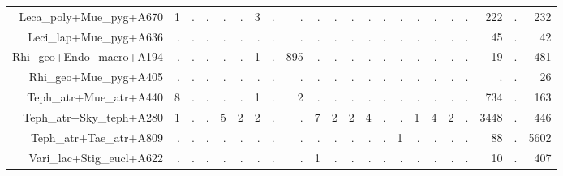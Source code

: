 \documentclass[a4paper, 11]{article}\usepackage[]{graphicx}\usepackage[]{color}
\begin{document}
\begin{table}
\begin{tabular}{rrrrrrrrrrrrrrrrrrrrrr}
  Leca\_poly+Mue\_pyg+A670 & 1 & . & . & . & . & 3 & . & . & . & . & . & . & . & . & . & . & . & . & 222 & . & 232 \\ 
  Leci\_lap+Mue\_pyg+A636 & . & . & . & . & . & . & . & . & . & . & . & . & . & . & . & . & . & . & 45 & . & 42 \\ 
  Rhi\_geo+Endo\_macro+A194 & . & . & . & . & . & 1 & . & 895 & . & . & . & . & . & . & . & . & . & . & 19 & . & 481 \\ 
  Rhi\_geo+Mue\_pyg+A405 & . & . & . & . & . & . & . & . & . & . & . & . & . & . & . & . & . & . & . & . & 26 \\ 
  Teph\_atr+Mue\_atr+A440 & 8 & . & . & . & . & 1 & . & 2 & . & . & . & . & . & . & . & . & . & . & 734 & . & 163 \\ 
  Teph\_atr+Sky\_teph+A280 & 1 & . & . & 5 & 2 & 2 & . & . & 7 & 2 & 2 & 4 & . & . & 1 & 4 & 2 & . & 3448 & . & 446 \\ 
  Teph\_atr+Tae\_atr+A809 & . & . & . & . & . & . & . & . & . & . & . & . & . & 1 & . & . & . & . & 88 & . & 5602 \\ 
  Vari\_lac+Stig\_eucl+A622 & . & . & . & . & . & . & . & . & 1 & . & . & . & . & . & . & . & . & . & 10 & . & 407 \\ 
   \hline
\end{tabular}
\end{table}
\end{document}
